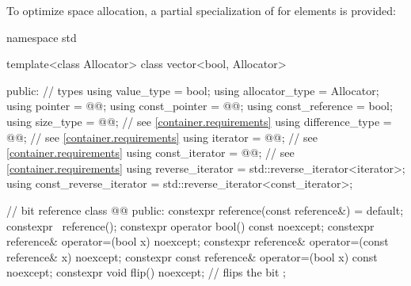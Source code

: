 \pnum
{}%
To optimize space allocation, a partial specialization of  for
 elements is provided:
\begin{codeblock}
namespace std {
  template<class Allocator>
  class vector<bool, Allocator> {
  public:
    // types
    using value_type             = bool;
    using allocator_type         = Allocator;
    using pointer                = @@;
    using const_pointer          = @@;
    using const_reference        = bool;
    using size_type              = @@; // see \ref{container.requirements}
    using difference_type        = @@; // see \ref{container.requirements}
    using iterator               = @@; // see \ref{container.requirements}
    using const_iterator         = @@; // see \ref{container.requirements}
    using reverse_iterator       = std::reverse_iterator<iterator>;
    using const_reverse_iterator = std::reverse_iterator<const_iterator>;

    // bit reference
    class @@ {
    public:
      constexpr reference(const reference&) = default;
      constexpr ~reference();
      constexpr operator bool() const noexcept;
      constexpr reference& operator=(bool x) noexcept;
      constexpr reference& operator=(const reference& x) noexcept;
      constexpr const reference& operator=(bool x) const noexcept;
      constexpr void flip() noexcept;   // flips the bit
    };

}}
\end{codeblock}
